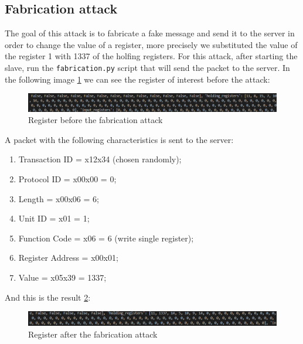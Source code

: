 \documentclass[12pt]{article}
\begin{document}
\subsection{Fabrication attack}
The goal of this attack is to fabricate a fake message and send it to the server in order to change the value 
of a register, more precisely we substituted the value of the register 1 with 1337 of the holfing registers.
For this attack, after starting the slave, run the \texttt{fabrication.py} script that will send the packet to the server.
In the following image \ref{fig:beforeFabrication} we can see the register of interest before the attack:
\begin{figure}[h]
    \centering
    \includegraphics[width=1\textwidth]{images/BeforeFabrication.png}
    \caption{Register before the fabrication attack}
    \label{fig:beforeFabrication}
\end{figure}
A packet with the following characteristics is sent to the server:
\begin{enumerate}
    \item Transaction ID = x12x34 (chosen randomly);
    \item Protocol ID = x00x00 = 0;
    \item Length = x00x06 = 6;
    \item Unit ID = x01 = 1;
    \item Function Code = x06 = 6 (write single register);
    \item Register Address = x00x01;
    \item Value = x05x39 = 1337;
\end{enumerate}
And this is the result \ref{fig:afterFabrication}:
\begin{figure}[h]
    \centering
    \includegraphics[width=1\textwidth]{images/AfterFabrication.png}
    \caption{Register after the fabrication attack}
    \label{fig:afterFabrication}
\end{figure}
\end{document}
